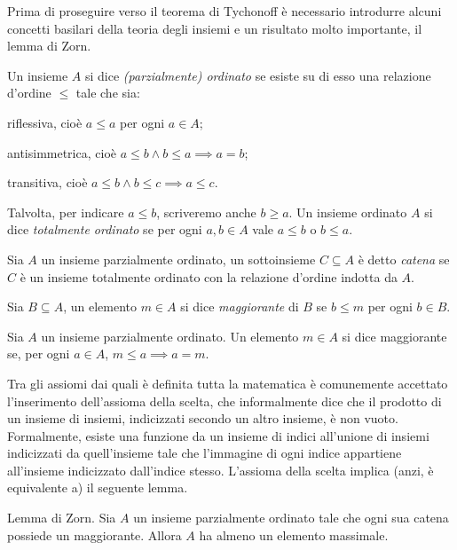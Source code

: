 Prima di proseguire verso il teorema di Tychonoff è necessario introdurre alcuni concetti basilari della teoria degli insiemi e un risultato molto importante, il lemma di Zorn.

\begin{defn}
  Un insieme $A$ si dice \textit{(parzialmente) ordinato} se esiste su di esso una relazione d'ordine $\le$ tale che sia:
  \begin{nlist}
    \item riflessiva, cioè $a \le a$ per ogni $a \in A$;
    \item antisimmetrica, cioè $a \le b \land b \le a \implies a=b$;
    \item transitiva, cioè $a \le b \land b \le c \implies a \le c$.
  \end{nlist}
  Talvolta, per indicare $a \le b$, scriveremo anche $b \ge a$.
  Un insieme ordinato $A$ si dice \textit{totalmente ordinato} se per ogni $a, b \in A$ vale $a \le b$ o $b \le a$.
\end{defn}

\begin{defn}
  Sia $A$ un insieme parzialmente ordinato, un sottoinsieme $C \subseteq A$ è detto \textit{catena} se $C$ è un insieme totalmente ordinato con la relazione d'ordine indotta da $A$.
\end{defn}

\begin{defn}
  Sia $B \subseteq A$, un elemento $m \in A$ si dice \textit{maggiorante} di $B$ se $b \le m$ per ogni $b \in B$.
\end{defn}

\begin{defn}
  Sia $A$ un insieme parzialmente ordinato. Un elemento $m \in A$ si dice maggiorante se, per ogni $a \in A$, $m \le a \implies a=m$.
\end{defn}

Tra gli assiomi dai quali è definita tutta la matematica è comunemente accettato l'inserimento dell'assioma della scelta, che informalmente dice che il prodotto di un insieme di insiemi, indicizzati secondo un altro insieme, è non vuoto. Formalmente, esiste una funzione da un insieme di indici all'unione di insiemi indicizzati da quell'insieme tale che l'immagine di ogni indice appartiene all'insieme indicizzato dall'indice stesso. L'assioma della scelta implica (anzi, è equivalente a) il seguente lemma.

\begin{lm}
  Lemma di Zorn. Sia $A$ un insieme parzialmente ordinato tale che ogni sua catena possiede un maggiorante. Allora $A$ ha almeno un elemento massimale.
\end{lm}

